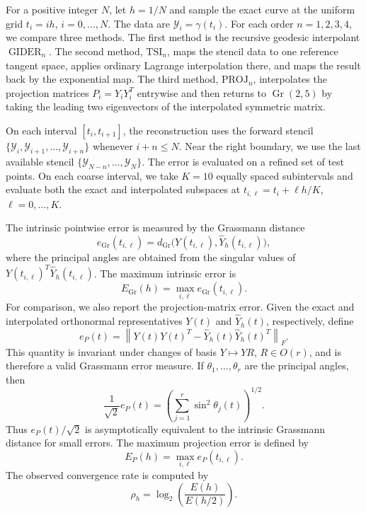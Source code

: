 \documentclass[a4paper,11pt]{article}
\DeclareMathOperator{\Gr}{Gr}
\newcommand{\GIDER}{\operatorname{GIDER}}
\numberwithin{equation}{section}
\theoremstyle{plain}
\theoremstyle{definition}
\theoremstyle{remark}
\begin{document}
For a positive integer \(N\), let \(h=1/N\) and sample the exact curve at the uniform grid \(t_i=ih\), \(i=0,\ldots,N\).  The data are \(\mathcal{Y}_i=\gamma(t_i)\).  For each order \(n=1,2,3,4\), we compare three methods.  The first method is the recursive geodesic interpolant \(\GIDER_n\).  The second method, \(\mathrm{TSI}_n\), maps the stencil data to one reference tangent space, applies ordinary Lagrange interpolation there, and maps the result back by the exponential map.  The third method, \(\mathrm{PROJ}_n\), interpolates the projection matrices \(P_i=Y_iY_i^T\) entrywise and then returns to \(\Gr(2,5)\) by taking the leading two eigenvectors of the interpolated symmetric matrix.

On each interval \([t_i,t_{i+1}]\), the reconstruction uses the forward stencil \(\{\mathcal{Y}_i,\mathcal{Y}_{i+1},\ldots,\mathcal{Y}_{i+n}\}\) whenever \(i+n\le N\).  Near the right boundary, we use the last available stencil \(\{\mathcal{Y}_{N-n},\ldots,\mathcal{Y}_N\}\).  The error is evaluated on a refined set of test points.  On each coarse interval, we take \(K=10\) equally spaced subintervals and evaluate both the exact and interpolated subspaces at \(t_{i,\ell}=t_i+\ell h/K\), \(\ell=0,\ldots,K\).

The intrinsic pointwise error is measured by the Grassmann distance
\[
    e_{\Gr}(t_{i,\ell})
    =
    d_{\Gr}\bigl(Y(t_{i,\ell}),\widehat Y_h(t_{i,\ell})\bigr),
\]
where the principal angles are obtained from the singular values of \(Y(t_{i,\ell})^T\widehat Y_h(t_{i,\ell})\).  The maximum intrinsic error is
\[
    E_{\Gr}(h)
    =
    \max_{i,\ell} e_{\Gr}(t_{i,\ell}).
\]
For comparison, we also report the projection-matrix error.  Given the exact and interpolated orthonormal representatives \(Y(t)\) and \(\widehat Y_h(t)\), respectively, define
\[
    e_P(t)
    =
    \left\|
        Y(t)Y(t)^T
        -
        \widehat Y_h(t)\widehat Y_h(t)^T
    \right\|_F.
\]
This quantity is invariant under changes of basis \(Y\mapsto YR\), \(R\in O(r)\), and is therefore a valid Grassmann error measure.  If \(\theta_1,\ldots,\theta_r\) are the principal angles, then
\[
    \frac{1}{\sqrt{2}}e_P(t)
    =
    \left(\sum_{j=1}^r\sin^2\theta_j(t)\right)^{1/2}.
\]
Thus \(e_P(t)/\sqrt{2}\) is asymptotically equivalent to the intrinsic Grassmann distance for small errors.  The maximum projection error is defined by
\[
    E_P(h)=\max_{i,\ell} e_P(t_{i,\ell}).
\]
The observed convergence rate is computed by
\[
    \rho_h
    =
    \log_2\left(\frac{E(h)}{E(h/2)}\right).
\]
\end{document}
